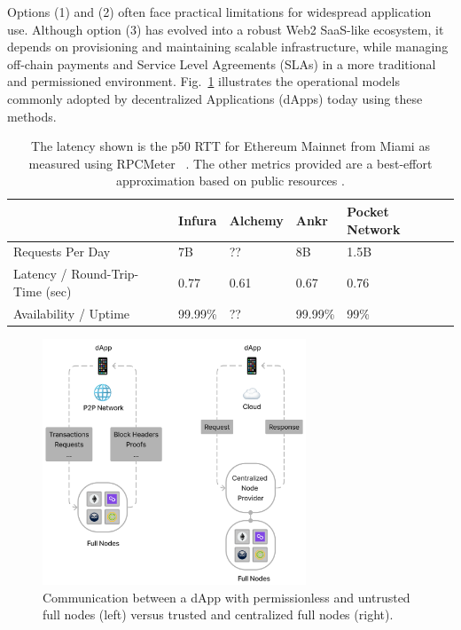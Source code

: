 \documentclass[runningheads]{llncs}
\begin{document}
Options (1) and (2) often face practical limitations for widespread application use. Although option (3) has evolved into a robust Web2 SaaS-like ecosystem, it depends on provisioning and maintaining scalable infrastructure, while managing off-chain payments and Service Level Agreements (SLAs) in a more traditional and permissioned environment. Fig.~\ref{fig:light-full-node} illustrates the operational models commonly adopted by decentralized Applications (dApps) today using these methods.

\begin{table}
    \centering    
    \begin{tabular}{|l|P{1.5cm}|P{1.2cm}|P{1.2cm}|P{1.1cm}|P{2cm}|}
        \hline & Infura & Alchemy & Ankr & Pocket Network \\
        \hline
            Requests Per Day & 7B & ?? & 8B & 1.5B  \\
            Latency / Round-Trip-Time (sec) & 0.77 & 0.61 & 0.67 & 0.76  \\
            Availability / Uptime & 99.99\% & ?? & 99.99\% & 99\%  \\
        \hline
    \end{tabular}
    \caption{The latency shown is the p50 RTT for Ethereum Mainnet from Miami as measured using RPCMeter ~\cite{rpcmeterRPCMeter}. The other metrics provided are a best-effort approximation based on public resources \cite{ankrUsage}\cite{infuraUsage}.}
    \label{rpc-node-usage}    
\end{table}

\begin{figure}
    \centering
    \includegraphics[width=0.7\textwidth]{light_full_node.png}
    \caption{Communication between a dApp with permissionless and untrusted full nodes (left) versus trusted and centralized full nodes (right).} \label{fig:light-full-node}
\end{figure}
\end{document}
